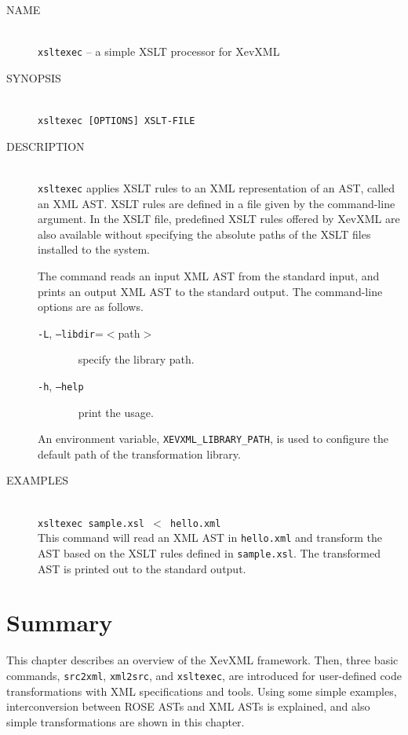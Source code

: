 \begin{framed}
\begin{description}
 \item[NAME]~\\
	    \texttt{xsltexec} -- a simple XSLT processor for XevXML

 \item[SYNOPSIS]~\\
	    \texttt{xsltexec [OPTIONS] XSLT-FILE}

 \item[DESCRIPTION]~\\ \texttt{xsltexec} applies XSLT rules to an XML
	    representation of an AST, called an XML AST. XSLT rules are
	    defined in a file given by the command-line argument. In the
	    XSLT file, predefined XSLT rules offered by XevXML are also
	    available without specifying the absolute paths of the XSLT
	    files installed to the system.

	    The command reads an input XML AST from the standard input,
	    and prints an output XML AST to the standard output. The
	    command-line options are as follows.

	    \begin{description}
	    \item[\texttt{-L}, \texttt{--libdir}=$<$path$>$]~\newline
	    specify the library path.      
    	    \item[\texttt{-h}, \texttt{--help}]~\newline
	    print the usage.
	    \end{description}

	    An environment variable, \texttt{XEVXML\_LIBRARY\_PATH},
	    is used to configure the default path of the transformation
	    library.
 \item[EXAMPLES]~\\ \texttt{xsltexec sample.xsl $<$ hello.xml}\\ This
	    command will read an XML AST in \texttt{hello.xml} and
	    transform the AST based on the XSLT rules defined in
	    \texttt{sample.xsl}. The transformed AST is printed out to
	    the standard output.
\end{description}
\end{framed}



\section{Summary}
This chapter describes an overview of the XevXML framework. Then, three
basic commands, \texttt{src2xml}, \texttt{xml2src}, and
\texttt{xsltexec}, are introduced for user-defined code transformations
with XML specifications and tools. Using some simple examples,
interconversion between ROSE ASTs and XML ASTs is explained, and also
simple transformations are shown in this chapter.

